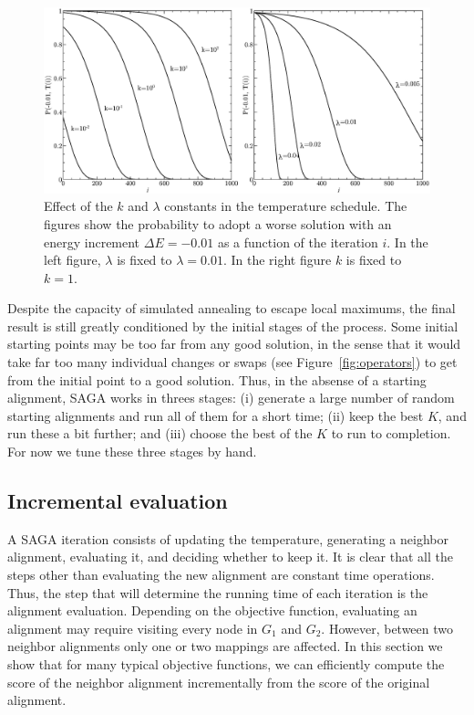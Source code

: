 \documentclass{bioinfo}
\begin{document}
\begin{methods}
\begin{figure}
\centering
\includegraphics[width=0.99\linewidth]{./SA_parameters.eps}
\caption{Effect of the $k$ and $\lambda$ constants in the temperature schedule. The figures show the probability to adopt a worse solution with an energy increment $\Delta E = -0.01$ as a function of the iteration $i$. In the left figure, $\lambda$ is fixed to $\lambda=0.01$. In the right figure $k$ is fixed to $k=1$.}
\label{fig:parameters}
\end{figure}

Despite the capacity of simulated annealing to escape local maximums, the final result is still greatly conditioned by the initial stages of the process. Some initial starting points may be too far from any good solution, in the sense that it would take far too many individual changes or swaps (see Figure~\ref{fig:operators}) to get from the initial point to a good solution.
Thus, in the absense of a starting alignment, SAGA works in threes stages: (i) generate a large number of random starting alignments and run all of them for a short time; (ii) keep the best $K$, and run these a bit further; and (iii) choose the best of the $K$ to run to completion.  For now we tune these three stages by hand.

\subsection{Incremental evaluation}\label{implementation}

A SAGA iteration consists of updating the temperature, generating a neighbor alignment, evaluating it, and deciding whether to keep it. It is clear that all the steps other than evaluating the new alignment are constant time operations. Thus, the step that will determine the running time of each iteration is the alignment evaluation. Depending on the objective function, evaluating an alignment may require visiting every node in $G_1$ and $G_2$. However, between two neighbor alignments only one or two mappings are affected. In this section we show that for many typical objective functions, we can efficiently compute the score of the neighbor alignment incrementally from the score of the original alignment.


\end{methods}
\end{document}
